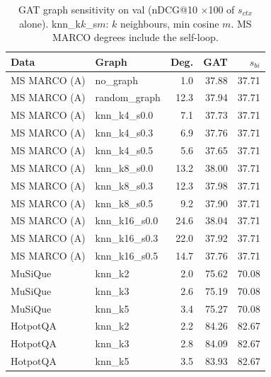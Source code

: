 \begin{table}[t]
\centering\footnotesize\setlength{\tabcolsep}{3pt}
\begin{tabular}{llrrr}
\toprule
Data & Graph & Deg. & GAT & $s_{bi}$ \\
\midrule
MS MARCO (A) & no\_graph & 1.0 & 37.88 & 37.71 \\
MS MARCO (A) & random\_graph & 12.3 & 37.94 & 37.71 \\
MS MARCO (A) & knn\_k4\_s0.0 & 7.1 & 37.73 & 37.71 \\
MS MARCO (A) & knn\_k4\_s0.3 & 6.9 & 37.76 & 37.71 \\
MS MARCO (A) & knn\_k4\_s0.5 & 5.6 & 37.65 & 37.71 \\
MS MARCO (A) & knn\_k8\_s0.0 & 13.2 & 38.00 & 37.71 \\
MS MARCO (A) & knn\_k8\_s0.3 & 12.3 & 37.98 & 37.71 \\
MS MARCO (A) & knn\_k8\_s0.5 & 9.2 & 37.90 & 37.71 \\
MS MARCO (A) & knn\_k16\_s0.0 & 24.6 & 38.04 & 37.71 \\
MS MARCO (A) & knn\_k16\_s0.3 & 22.0 & 37.92 & 37.71 \\
MS MARCO (A) & knn\_k16\_s0.5 & 14.7 & 37.76 & 37.71 \\
\midrule
MuSiQue & knn\_k2 & 2.0 & 75.62 & 70.08 \\
MuSiQue & knn\_k3 & 2.6 & 75.19 & 70.08 \\
MuSiQue & knn\_k5 & 3.4 & 75.27 & 70.08 \\
HotpotQA & knn\_k2 & 2.2 & 84.26 & 82.67 \\
HotpotQA & knn\_k3 & 2.8 & 84.09 & 82.67 \\
HotpotQA & knn\_k5 & 3.5 & 83.93 & 82.67 \\
\bottomrule
\end{tabular}
\caption{GAT graph sensitivity on val (nDCG@10 $\times$100 of $s_{ctx}$ alone). knn\_k$k$\_s$m$: $k$ neighbours, min cosine $m$. MS MARCO degrees include the self-loop.}
\label{tab:controls}
\end{table}
